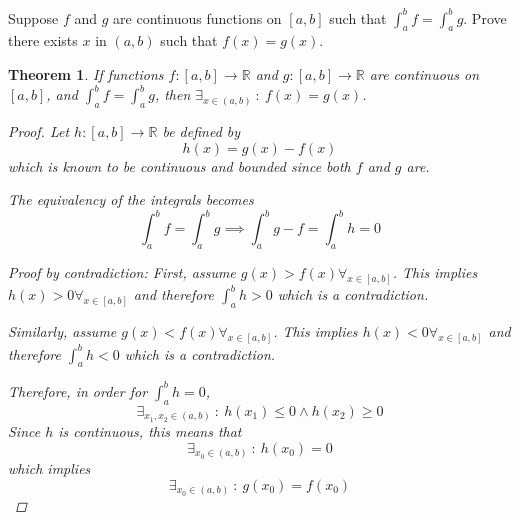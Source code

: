 \documentclass[]{article}
\newcommand{\R}{\mathbb{R}}
\newcommand{\st}{\ : \ }
\newtheorem{theorem}{Theorem}
\begin{document}
\newpage
\section{}
Suppose $f$ and $g$ are continuous functions on $[a,b]$ such that $\int_{a}^{b} f = \int_{a}^{b} g$. 
Prove there exists $x$ in $(a,b)$ such that $f(x) = g(x)$.

\begin{theorem}
    If functions $f:[a,b]\to\R$ and $g:[a,b]\to\R$ are continuous on $[a,b]$,
    and $\int_{a}^{b} f = \int_{a}^{b} g$, then $\exists_{x\in(a,b)} \st f(x) = g(x)$.
    \begin{proof}
        Let $h:[a,b]\to\R$ be defined by \[
            h(x) = g(x) - f(x)
        \] which is known to be continuous and bounded since both $f$ and $g$ are.
        
        The equivalency of the integrals becomes \[
            \int_{a}^{b} f = \int_{a}^{b} g \implies \int_{a}^{b} g - f = \int_{a}^{b} h = 0 
        \]

        Proof by contradiction:
        First, assume $g(x) > f(x) \forall_{x\in[a,b]}$.
        This implies $h(x) > 0 \forall_{x\in[a,b]}$ and therefore $\int_{a}^{b} h > 0$ which is a contradiction.

        Similarly, assume $g(x) < f(x) \forall_{x\in[a,b]}$.
        This implies $h(x) < 0 \forall_{x\in[a,b]}$ and therefore $\int_{a}^{b} h < 0$ which is a contradiction.

        Therefore, in order for $\int_{a}^{b} h = 0$,\[
            \exists_{x_1,x_2 \in (a,b)} \st h(x_1) \leq 0 \land h(x_2) \geq 0
        \] Since $h$ is continuous, this means that \[
            \exists_{x_0\in (a,b)} \st h(x_0) = 0
        \] which implies \[
            \exists_{x_0\in (a,b)} \st g(x_0) = f(x_0)
        \]
    \end{proof}
\end{theorem}
\end{document}
